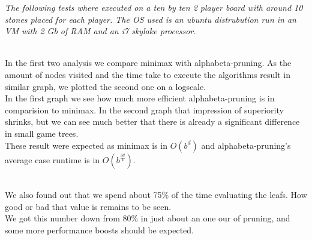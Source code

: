 \textit{The following tests where executed on a ten by ten 2 player board with around 10 stones placed for each player. The OS used is an ubuntu distrubution run in an VM with 2 Gb of RAM and an i7 skylake processor.}\\\\



In the first two analysis we compare minimax with alphabeta-pruning. As the amount of nodes visited and the time take to execute the algorithms result in similar graph, we plotted the second one on a logscale. \\
In the first graph we see how much more efficient alphabeta-pruning is in comparision to minimax. In the second graph that impression of superiority shrinks, but we can see much better that there is already a significant difference in small game trees.\\
These result were expected as minimax is in $O(b^{d})$ and alphabeta-pruning's average case runtime is in $O(b^{\frac{3d}{4}})$.\\\\

We also found out that we spend about 75\% of the time evaluating the leafs. How good or bad that value is remains to be seen.\\
We got this number down from 80\% in just about an one our of pruning, and some more performance boosts should be expected.\\\\


